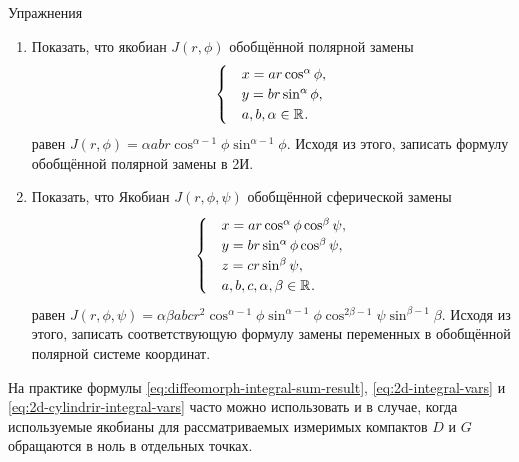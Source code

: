 \begin{statement}{Упражнения} \begin{enumerate}
    \item Показать, что якобиан $J(r, \phi)$ обобщённой полярной замены
	\begin{equation*}
		\begin{cases}
			&x = ar \cos^{\alpha}\phi,\\
			&y = br \sin^{\alpha}\phi,\\
			&a, b, \alpha \in \mathbb{R}^{}.\\
		\end{cases}
	\end{equation*}
	равен $J(r, \phi) = \alpha abr \cos^{\alpha - 1}\phi\sin^{\alpha - 1}\phi$. Исходя из этого,
	записать формулу обобщённой полярной замены в 2И.

	\item Показать, что Якобиан $J(r, \phi, \psi)$ обобщённой сферической замены
	\begin{equation*}
		\begin{cases}
			&x = ar \cos^{\alpha}\phi\cos^{\beta}\psi,\\
			&y = br \sin^{\alpha}\phi\cos^{\beta}\psi,\\
			&z = cr \sin^{\beta}\psi,\\
			&a, b, c, \alpha, \beta \in \mathbb{R}^{}.\\
		\end{cases}
	\end{equation*}
	равен $J(r, \phi, \psi) = \alpha \beta abcr^2 \cos^{\alpha - 1}\phi\sin^{\alpha - 1}\phi
	\cos^{2\beta - 1}\psi\sin^{\beta - 1}\beta$. Исходя из этого, записать соответствующую
	формулу замены переменных в обобщённой полярной системе координат.
\end{enumerate} \end{statement}

\begin{note}
	На практике формулы \eqref{eq:diffeomorph-integral-sum-result}, \eqref{eq:2d-integral-vars} и \eqref{eq:2d-cylindrir-integral-vars} часто можно
	использовать и в случае, когда используемые якобианы для рассматриваемых измеримых компактов
	$D$ и $G$ обращаются в ноль в отдельных точках.
\end{note}

